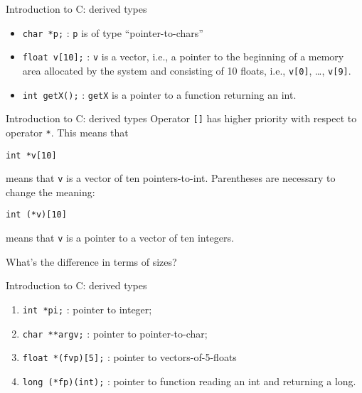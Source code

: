 \begin{frame}[fragile]{Introduction to C: derived types}
\begin{itemize}
\item \verb"char *p;" : \verb"p" is of type ``pointer-to-chars''
\item \verb"float v[10];" : \verb"v" is a vector, i.e., a pointer to the beginning of
  a memory area allocated by the system and consisting of 10 floats, i.e.,
  \verb"v[0]", \ldots, \verb"v[9]".
\item \verb"int getX();" : \verb"getX" is a pointer to a function returning an int.
\end{itemize}


\end{frame}
\begin{frame}[fragile]{Introduction to C: derived types}
Operator \verb"[]" has higher priority with respect to operator
\verb"*". This means that


\vspace{20pt}

\begin{center}
           \tt int *v[10]
\end{center}


\vspace{20pt}

\noindent means that \verb"v" is a vector of ten pointers-to-int.
Parentheses are necessary to change the meaning:


\vspace{20pt}

\begin{center}
           \tt int (*v)[10]
\end{center}

\noindent means that \verb"v" is a pointer to a vector of ten integers.


\vspace{20pt}

What's the difference in terms of sizes?


\end{frame}
\begin{frame}[fragile]{Introduction to C: derived types}
\begin{enumerate}
\item \verb"int *pi;" : pointer to integer;
\item \verb"char **argv;" : pointer to pointer-to-char;
\item \verb"float *(fvp)[5];" : pointer to vectors-of-5-floats
\item \verb"long (*fp)(int);" : pointer to function reading an int and returning a long.
\end{enumerate}

\end{frame}
